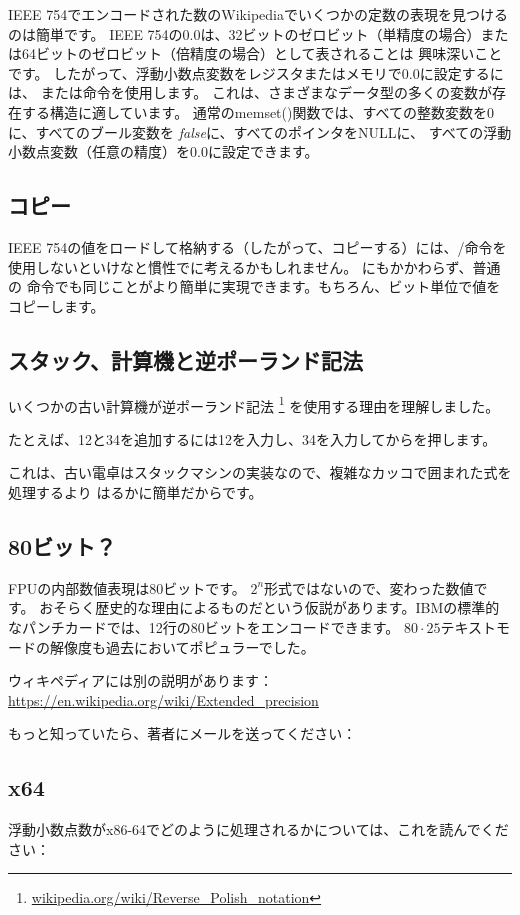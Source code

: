 IEEE 754でエンコードされた数のWikipediaでいくつかの定数の表現を見つけるのは簡単です。 
IEEE 754の0.0は、32ビットのゼロビット（単精度の場合）または64ビットのゼロビット（倍精度の場合）として表されることは
興味深いことです。
したがって、浮動小数点変数をレジスタまたはメモリで0.0に設定するには、 \MOV または命令を使用します。
これは、さまざまなデータ型の多くの変数が存在する構造に適しています。
通常のmemset()関数では、すべての整数変数を0に、すべてのブール変数を \emph{false}に、すべてのポインタをNULLに、
すべての浮動小数点変数（任意の精度）を0.0に設定できます。

\subsection{コピー}

IEEE 754の値をロードして格納する（したがって、コピーする）には、/命令を使用しないといけなと慣性でに考えるかもしれません。
にもかかわらず、普通の \MOV 命令でも同じことがより簡単に実現できます。もちろん、ビット単位で値をコピーします。

\subsection{スタック、計算機と逆ポーランド記法}


いくつかの古い計算機が逆ポーランド記法
\footnote{\href{http://go.yurichev.com/17354}{wikipedia.org/wiki/Reverse\_Polish\_notation}}
を使用する理由を理解しました。

たとえば、12と34を追加するには12を入力し、34を入力してからを押します。

これは、古い電卓はスタックマシンの実装なので、複雑なカッコで囲まれた式を処理するより
はるかに簡単だからです。

\subsection{80ビット？}

FPUの内部数値表現は80ビットです。
$2^n$形式ではないので、変わった数値です。
おそらく歴史的な理由によるものだという仮説があります。IBMの標準的なパンチカードでは、12行の80ビットをエンコードできます。 
$80\cdot 25$テキストモードの解像度も過去においてポピュラーでした。

ウィキペディアには別の説明があります：\url{https://en.wikipedia.org/wiki/Extended_precision}

もっと知っていたら、著者にメールを送ってください： \EMAIL{}

\subsection{x64}

浮動小数点数がx86-64でどのように処理されるかについては、これを読んでください：


